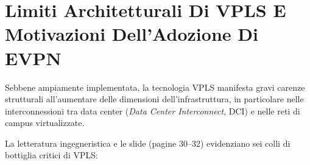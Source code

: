 \documentclass[11pt, a4paper]{article}
\begin{document}
\section{Limiti Architetturali Di VPLS E Motivazioni Dell'Adozione Di EVPN}

Sebbene ampiamente implementata, la tecnologia VPLS manifesta gravi carenze strutturali all'aumentare delle dimensioni dell'infrastruttura, in particolare nelle interconnessioni tra data center (\emph{Data Center Interconnect}, DCI) e nelle reti di campus virtualizzate.


La letteratura ingegneristica e le slide (pagine 30--32) evidenziano sei colli di bottiglia critici di VPLS:
\end{document}
